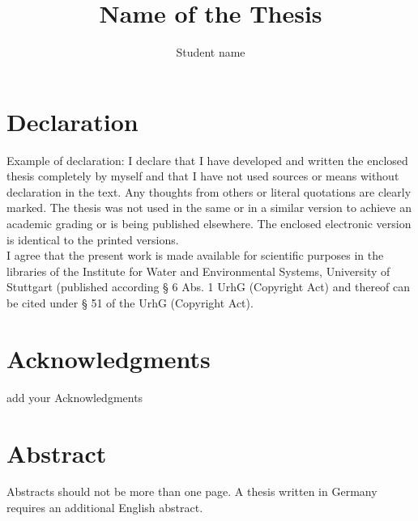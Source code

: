 \documentclass[11pt,twoside]{report}
\title{\textbf{Name of the Thesis}} %
\author{Student name} %
\begin{document}


\newpage\null\thispagestyle{empty}\newpage


\chapter*{Declaration}
{
	Example of declaration:
	I declare that I have developed and written the enclosed thesis completely by myself and that I have not used sources or means without declaration in the text. Any thoughts from others or literal quotations are clearly marked. The thesis was not used in the same or in a similar version to achieve an academic grading or is being published elsewhere. The enclosed electronic version is identical to the printed versions.\\
	
	I agree that the present work is made available for scientific purposes in the libraries of the Institute for Water and Environmental Systems, University of Stuttgart (published according § 6 Abs. 1 UrhG (Copyright Act) and thereof can be cited under § 51 of the UrhG (Copyright Act).
}

\chapter*{Acknowledgments}
{
add your Acknowledgments
}

\chapter*{Abstract}
{
Abstracts should not be more than one page. A thesis written in Germany requires an additional English abstract. 
}

\tableofcontents
\clearpage

\listoffigures
{}

\listoftables
{}

\pagestyle{fancy}
\fancyhf{}
\fancyhead[LE,RO]{\nouppercase{\leftmark}}
\fancyhead[RE,LO]{\nouppercase{\rightmark}}
\fancyfoot[LE,RO]{\thepage}
\renewcommand{\headrulewidth}{1.0pt}


\cleardoublepage


	


\end{document}
